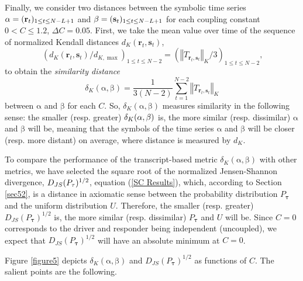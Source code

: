 \documentclass[%
 aip,
 amsmath,amssymb,
 reprint,%
]{revtex4-1}
\begin{document}
Finally, we consider two distances between the symbolic time series $\mathrm{%
\alpha }=(\mathbf{r}_{t})_{1\leq t\leq N-L+1}$ and $\mathrm{\beta }=(\mathbf{%
s}_{t})_{1\leq t\leq N-L+1}$ for each coupling constant $0<C\leq 1.2$, $%
\Delta C=0.05$. First, we take the mean value over time of the sequence of
normalized Kendall distances $d_{K}(\mathbf{r}_{t},\mathbf{s}_{t})$, 
\begin{equation*}
(d_{K}(\mathbf{r}_{t},\mathbf{s}_{t})/d_{K,\max })_{1\leq t\leq
N-2}=(\left\Vert T_{\mathbf{r}_{t},\mathbf{s}_{t}}\right\Vert _{K}/3)_{1\leq
t\leq N-2}\text{,}
\end{equation*}%
to obtain the \textit{similarity distance}%
\begin{equation}
\delta _{K}(\mathrm{\alpha },\mathrm{\beta })=\frac{1}{3(N-2)}%
\sum_{t=1}^{N-2}\left\Vert T_{\mathbf{r}_{t},\mathbf{s}_{t}}\right\Vert _{K}
\label{d_K average}
\end{equation}%
between $\mathrm{\alpha }$ and $\mathrm{\beta }$ for each $C$. So, $\delta
_{K}(\mathrm{\alpha },\mathrm{\beta })$ measures similarity in the following
sense: the smaller (resp. greater) $\delta _{K}(\mathrm{\alpha },\mathrm{%
\beta })$ is, the more similar (resp. dissimilar) $\mathrm{\alpha }$ and $%
\mathrm{\beta }$ will be, meaning that the symbols of the time series $%
\mathrm{\alpha }$ and $\mathrm{\beta }$ will be closer (resp. more distant)
on average, where distance is measured by $d_{K}$.

To compare the performance of the transcript-based metric $\delta _{K}(%
\mathrm{\alpha },\mathrm{\beta })$ with other metrics, we have selected the
square root of the normalized Jensen-Shannon divergence, $D_{JS}(P_{\mathbf{%
\tau }})^{1/2}$, equation (\ref{SC Results}), which, according to Section %
\ref{sec52}, is a distance in axiomatic sense between the probability
distribution $P_{\mathbf{\tau }}$ and the uniform distribution $U$.
Therefore, the smaller (resp. greater) $D_{JS}(P_{\mathbf{\tau }})^{1/2}$
is, the more similar (resp. dissimilar) $P_{\mathbf{\tau }}$ and $U$ will
be. Since $C=0$ corresponds to the driver and responder being independent
(uncoupled), we expect that $D_{JS}(P_{\mathbf{\tau }})^{1/2}$ will have an
absolute minimum at $C=0$.

Figure \ref{figure5} depicts $\delta _{K}(\mathrm{\alpha },\mathrm{\beta })$
and $D_{JS}(P_{\mathbf{\tau }})^{1/2}$ as functions of $C$. The salient
points are the following.
\end{document}
